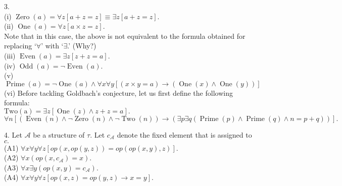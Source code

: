 \documentclass{article}
\begin{document}
\hrulefill

3.\\
(i) $\operatorname{Zero}(a) = \forall z[a + z = z] \equiv \exists z[a + z = z].$\\
(ii) $\operatorname{One}(a) = \forall z[a \times z = z].$\\
Note that in this case, the above is not equivalent to the formula obtained for replacing `$\forall$' with `$\exists$.' \hfill (Why?)\\
(iii) $\operatorname{Even}(a) = \exists z[z + z = a].$\\
(iv) $\operatorname{Odd}(a) = \neg \operatorname{Even}(a).$\\
(v) $\operatorname{Prime}(a) = \neg \operatorname{One}(a) \wedge \forall x\forall y[(x \times y = a) \to (\operatorname{One}(x) \wedge \operatorname{One}(y))]$\\
(vi) Before tackling Goldbach's conjecture, let us first define the following formula:\\
$\operatorname{Two(a)} = \exists z[\operatorname{One}(z) \wedge z + z = a].$
\[\forall n[(\operatorname{Even}(n) \wedge \neg \operatorname{Zero}(n) \wedge \neg \operatorname{Two}(n)) \to (\exists p \exists q(\operatorname{Prime}(p) \wedge \operatorname{Prime}(q) \wedge n = p + q))].\]

\hrulefill

4. Let $\mathcal{A}$ be a structure of $\tau.$ Let $c_\mathcal{A}$ denote the fixed element that is assigned to $c.$\\
(A1) $\forall x\forall y\forall z[op(x, op(y, z)) = op(op(x, y), z)].$\\
(A2) $\forall x(op(x, c_\mathcal{A}) = x).$\\
(A3) $\forall x \exists y(op(x, y) = c_\mathcal{A}).$\\
(A4) $\forall x\forall y\forall z[op(x, z) = op(y, z) \to x = y].$\\

\hrulefill
\end{document}
